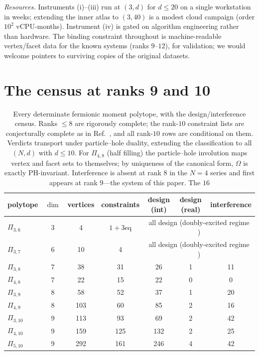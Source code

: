 \documentclass[11pt]{article}
\begin{document}
\emph{Resources.} Instruments (i)--(iii) run at $(3,d)$ for $d \le 20$ on a
single workstation in weeks; extending the inner atlas to $(3,40)$ is a
modest cloud campaign (order $10^2$ vCPU-months). Instrument (iv) is
gated on algorithm engineering rather than hardware. The binding constraint
throughout is machine-readable vertex/facet data for the known systems
(ranks $9$--$12$), for validation; we would welcome pointers to surviving
copies of the original datasets.

\section{The census at ranks 9 and 10}
\label{sec:census910}

\begin{table}[t]
\centering
\begin{tabular}{lcccccc}
\toprule
polytope & $\dim$ & vertices & constraints & design (int) & design (real) & interference \\
\midrule
$\Pi_{3,6}$ & 3 & 4 & $1{+}3$eq & \multicolumn{3}{c}{all design (doubly-excited regime \cite{MT17})} \\
$\Pi_{3,7}$ & 6 & 10 & 4 & \multicolumn{3}{c}{all design (doubly-excited regime \cite{MT17})} \\
$\Pi_{3,8}$ & 7 & 38 & 31 & 26 & 1 & 11 \\
$\Pi_{4,8}$ & 7 & 22 & 15 & 22 & 0 & 0 \\
$\Pi_{3,9}$ & 8 & 58 & 52 & 37 & 1 & 20 \\
$\Pi_{4,9}$ & 8 & 103 & 60 & 85 & 2 & 16 \\
$\Pi_{3,10}$ & 9 & 113 & 93 & 69 & 2 & 42 \\
$\Pi_{4,10}$ & 9 & 159 & 125 & 132 & 2 & 25 \\
$\Pi_{5,10}$ & 9 & 292 & 161 & 246 & 4 & 42 \\
\bottomrule
\end{tabular}
\caption{Every determinate fermionic moment polytope, with the
design/interference census. Ranks $\le 8$ are rigorously complete; the
rank-$10$ constraint lists are conjecturally complete as in
Ref.~\cite{AK2008}, and all rank-$10$ rows are conditional on them.
Verdicts transport under particle--hole duality, extending the
classification to all $(N,d)$ with $d\le 10$. For $\Pi_{4,8}$ (half
filling) the particle--hole involution maps vertex and facet sets to
themselves; by uniqueness of the canonical form, $\Omega$ is exactly
PH-invariant. Interference is absent at rank $8$ in the $N{=}4$ series
and first appears at rank $9$---the system of this paper. The $16$
}
\end{table}
\end{document}
